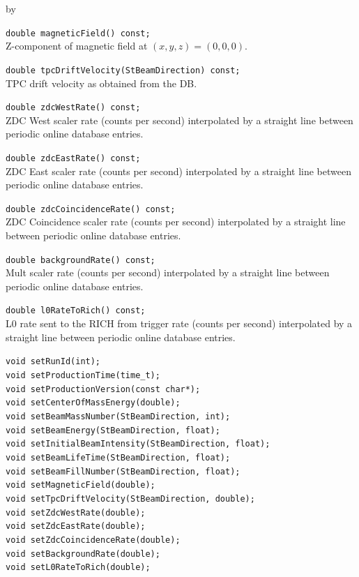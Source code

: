 \documentclass[twoside]{article}
\newcommand{\entrylabel}[1]{\mbox{\textbf{{#1}}}\hfil}%
\newenvironment{entry}
{\begin{list}{}%
    {\renewcommand{\makelabel}{\entrylabel}%
     \setlength{\labelwidth}{90pt}%
     \setlength{\leftmargin}{\labelwidth}
     \advance\leftmargin by \labelsep%
      }%
    }%
  {\end{list}}
\newcommand{\Entrylabel}[1]%
{\raisebox{0pt}[1ex][0pt]{\makebox[\labelwidth][l]%
    {\parbox[t]{\labelwidth}{\hspace{0pt}\textbf{{#1}}}}}}
\newenvironment{Entry}%
{\renewcommand{\entrylabel}{\Entrylabel}\begin{entry}}%
  {\end{entry}}
\begin{document}
\begin{Entry}
    \verb+double magneticField() const;+\\
    Z-component of magnetic field at $(x,y,z)=(0,0,0)$.
    
    \verb+double tpcDriftVelocity(StBeamDirection) const;+\\
    TPC drift velocity as obtained from the DB.
    
    \verb+double zdcWestRate() const;+\\
    ZDC West scaler rate (counts per second) interpolated by a
    straight line between periodic online database entries.

    \verb+double zdcEastRate() const;+\\
    ZDC East scaler rate (counts per second) interpolated by a
    straight line between periodic online database entries.

    \verb+double zdcCoincidenceRate() const;+\\
    ZDC Coincidence scaler rate (counts per second) interpolated by a
    straight line between periodic online database entries.

    \verb+double backgroundRate() const;+\\
    Mult scaler rate (counts per second) interpolated by a straight
    line between periodic online database entries.

    \verb+double l0RateToRich() const;+\\
    L0 rate sent to the RICH from trigger rate (counts per second)
    interpolated by a straight line between periodic online database
    entries.

    \verb+void setRunId(int);+\\
    \verb+void setProductionTime(time_t);+\\
    \verb+void setProductionVersion(const char*);+\\
    \verb+void setCenterOfMassEnergy(double);+\\
    \verb+void setBeamMassNumber(StBeamDirection, int);+\\
    \verb+void setBeamEnergy(StBeamDirection, float);+\\
    \verb+void setInitialBeamIntensity(StBeamDirection, float);+\\
    \verb+void setBeamLifeTime(StBeamDirection, float);+\\
    \verb+void setBeamFillNumber(StBeamDirection, float);+\\
    \verb+void setMagneticField(double);+\\
    \verb+void setTpcDriftVelocity(StBeamDirection, double);+\\
    \verb+void setZdcWestRate(double);+\\
    \verb+void setZdcEastRate(double);+\\
    \verb+void setZdcCoincidenceRate(double);+\\
    \verb+void setBackgroundRate(double);+\\
    \verb+void setL0RateToRich(double); +\\
\end{Entry}
\clearpage
\end{document}

